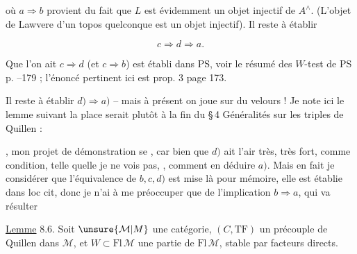 où $a\Longrightarrow b$ provient du fait que $L$ est évidemment un objet injectif de $A^\wedge$. (L'objet de Lawvere d'un topos quelconque est un objet injectif). Il reste à établir

\[
 c\Longrightarrow d\Longrightarrow a.
\]

Que l'on ait $c\Longrightarrow d$ (et $c\Longrightarrow b$) est établi dans PS, voir le résumé des  $W$-test de PS p. --179 ; l'énoncé pertinent ici est prop. 3 page 173.

Il reste à établir $d)\Longrightarrow a)$ -- mais à présent on joue sur du velours !
Je  note ici le lemme suivant  la place serait plutôt à la fin du \S\,4  Généralités sur les triples de Quillen :


, mon projet de démonstration se , car bien que
$d)$ ait l'air très, très fort, comme condition,
 telle quelle je ne vois pas, ,
comment en déduire $a)$. Mais en fait
 je  considérer que l'équivalence
de $b,c,d)$ est mise là pour mémoire, elle est établie dans loc cit,
donc je n'ai à me préoccuper que de l'implication $b\Longrightarrow a$, qui va résulter

\uline{Lemme} 8.6. Soit $\unsure{\mathcal{M}|M}$ une catégorie, $(C,\mathrm{TF})$
un précouple de Quillen dans $\mathcal{M}$, et $W\subset\mathrm{Fl}\,\mathcal{M}$ une partie de $\mathrm{Fl}\,\mathcal{M}$, stable par facteurs directs.
 

